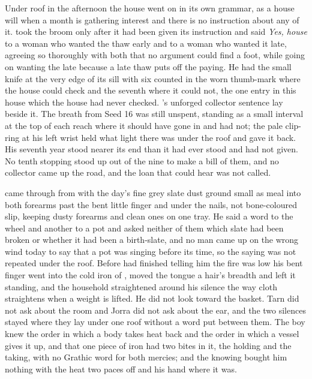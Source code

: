 Under  roof in the afternoon the house went on in its own grammar, as a house will when a month is gathering interest and there is no instruction about any of it.  took the broom only after it had been given its instruction and said \emph{Yes, house} to a woman who wanted the thaw early and to a woman who wanted it late, agreeing so thoroughly with both that no argument could find a foot, while going on wanting the late because a late thaw puts off the paying. He had the small knife at the very edge of its sill with six counted in the worn thumb-mark where the house could check and the seventh where it could not, the one entry in this house which the house had never checked. 's unforged collector sentence lay beside it. The breath from Seed 16 was still unspent, standing as a small interval at the top of each reach where it should have gone in and had not; the pale clip-ring at his left wrist held what light there was under the roof and gave it back. His seventh year stood nearer its end than it had ever stood and had not given. No tenth stopping stood up out of the nine to make a bill of them, and no collector came up the road, and the loan that could hear was not called.

 came through from  with the day's fine grey slate dust ground small as meal into both forearms past the bent little finger and under the nails, not bone-coloured slip, keeping dusty forearms and clean ones on one tray. He said a word to the wheel and another to a pot and asked neither of them which slate had been broken or whether it had been a birth-slate, and no man came up on the wrong wind today to say that a pot was singing before its time, so the saying was not repeated under the roof. Before  had finished telling him the fire was low his bent finger went into the cold iron of , moved the tongue a hair's breadth and left it standing, and the household straightened around his silence the way cloth straightens when a weight is lifted. He did not look toward the basket. Tarn did not ask about the room and Jorra did not ask about the ear, and the two silences stayed where they lay under one roof without a word put between them. The boy knew the order in which a body takes heat back and the order in which a vessel gives it up, and that one piece of iron had two bites in it, the holding and the taking, with no Grathic word for both mercies; and the knowing bought him nothing with the heat two paces off and his hand where it was.

